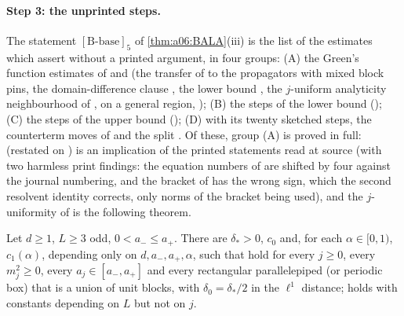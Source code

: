 
\paragraph{Step 3: the unprinted steps.} The statement $[\mathrm B\text{-base}]_5$ of \cref{thm:a06:BALA}(iii) is the list of the estimates which \cite{Ba1,Ba2,Ba3} assert without a printed argument, in four groups: (A) the Green's function estimates of \cite{Ba4} and \cite[Sect.~2]{Ba1} (the transfer of \cite[Cor.~2.3]{Ba4} to the propagators with mixed block pins, the domain-difference clause \cite[(1.20)]{Ba4}, the lower bound \cite[(1.15)]{Ba4}, the $j$-uniform analyticity neighbourhood of \cite[Lemma~2.4]{Ba4}, \cite[(1.8)]{Ba4} on a general region, \cite[Prop.~2.2]{Ba1}); (B) the steps of the lower bound (\cite[Props.~3.1--3.2, (3.20)--(3.21), (3.34)--(3.36), (3.66)--(3.69)]{Ba1}); (C) the steps of the upper bound (\cite[(2.11)--(2.14), Props.~2.1--2.2, 2.6, Lemma~2.7, (2.78), Sect.~3A, the $k$-uniformity of the per-step constants]{Ba2}); (D) \cite[Prop.~1]{Ba3} with its twenty sketched steps, the counterterm moves of \cite[p.~422]{Ba3} and the split \cite[(1.26)--(1.31)]{Ba3}. Of these, group (A) is proved in full: \cite[Prop.~2.3]{Ba1} (restated on \cite[p.~574]{Ba4}) is an implication of the printed statements \cite[(1.15), (1.16), (1.18), (1.20), (5.5), Cor.~2.3]{Ba4} read at source (with two harmless print findings: the equation numbers of \cite[Sect.~3]{Ba4} are shifted by four against the journal numbering, and the bracket of \cite[(3.9)]{Ba4} has the wrong sign, which the second resolvent identity corrects, only norms of the bracket being used), and the $j$-uniformity of \cite[Lemma~2.4]{Ba4} is the following theorem.

\begin{theorem}\label{thm:a06:A5}
Let $d\ge1$, $L\ge3$ odd, $0<a_-\le a_+$. There are $\delta_*>0$, $c_0$ and, for each $\alpha\in[0,1)$, $c_1(\alpha)$, depending only on $d,a_-,a_+,\alpha$, such that \cite[(2.35)--(2.36)]{Ba4} hold for every $j\ge0$, every $m_j^2\ge0$, every $a_j\in[a_-,a_+]$ and every rectangular parallelepiped (or periodic box) that is a union of unit blocks, with $\delta_0=\delta_*/2$ in the $\ell^1$ distance; \cite[(2.37)]{Ba4} holds with constants depending on $L$ but not on $j$.
\end{theorem}

